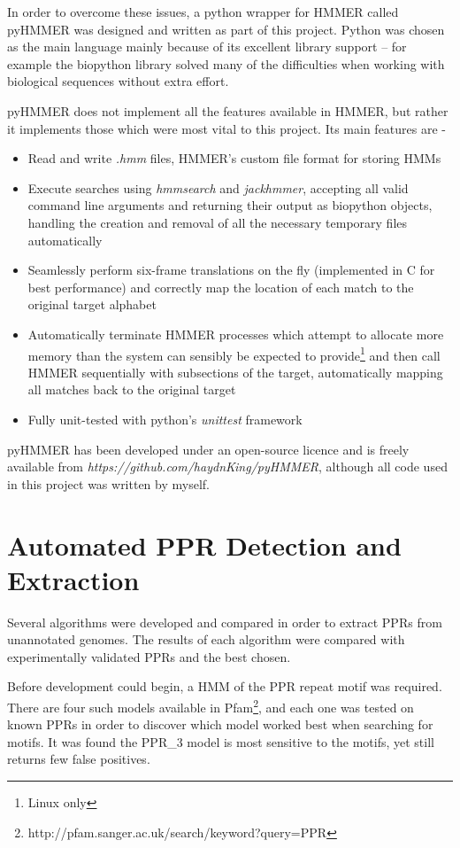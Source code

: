 In order to overcome these issues, a python wrapper for HMMER called
pyHMMER was designed and written as part of this project.
Python was chosen as the main language mainly because of its
excellent library support -- for example the biopython library solved many of 
the difficulties when working with biological sequences without extra effort.

pyHMMER does not implement all the features available in HMMER, but rather it
implements those which were most vital to this project.
Its main features are -
\begin{itemize}
  \item Read and write \emph{.hmm} files, HMMER's custom file format for
    storing HMMs
  \item Execute searches using 
    \emph{hmmsearch} and \emph{jackhmmer}, accepting all valid command line
    arguments and returning their output as biopython objects, 
    handling the creation and removal of all the necessary 
    temporary files automatically
  \item Seamlessly perform six-frame translations on the fly (implemented in C
    for best performance) and correctly map the location of each match to the 
    original target alphabet
  \item Automatically terminate HMMER processes which attempt to allocate more
    memory than the system can sensibly be expected to 
    provide\footnote{Linux only} and then call
    HMMER sequentially with subsections of the target, automatically mapping
    all matches back to the original target
  \item Fully unit-tested with python's \emph{unittest} framework
\end{itemize}
pyHMMER has been developed under an open-source licence and is freely available
from \emph{https://github.com/haydnKing/pyHMMER}, although all code used in
this project was written by myself.


\section{Automated PPR Detection and Extraction}
\label{sec:ppr_extraction}

Several algorithms were developed and compared in order to extract PPRs from
unannotated genomes.
The results of each algorithm were compared with experimentally validated PPRs
and the best chosen.

Before development could begin, a HMM of the PPR repeat motif was required.
There are four such models available in
Pfam\footnote{http://pfam.sanger.ac.uk/search/keyword?query=PPR}, and each one
was tested on known PPRs in order to discover which model worked best when
searching for motifs.
It was found the PPR\_3 model is most sensitive to the motifs, yet still
returns few false positives.

